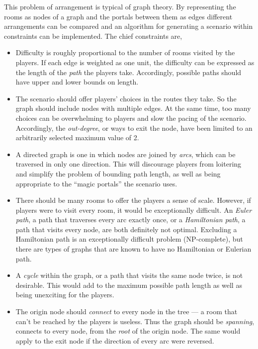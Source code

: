 \documentclass[landscape, a0, final]{a0poster}
\begin{document}
\begin{minipage}{0.25\linewidth}
\begin{minipage}{0.8\linewidth}
This problem of arrangement is typical of graph theory.  By representing the rooms as nodes of a graph and the portals between them as edges different arrangements can be compared and an algorithm for generating a scenario within constraints can be implemented.  The chief constraints are, 
    \begin{itemize} 
        \item Difficulty is roughly proportional to the number of rooms visited by the players.  If each edge is weighted as one unit, the difficulty can be expressed as the length of the \emph{path} the players take.  Accordingly, possible paths should have upper and lower bounds on length.
        \item The scenario should offer players' choices in the routes they take.  So the graph should include nodes with multiple edges.  At the same time, too many choices can be overwhelming to players and slow the pacing of the scenario.  Accordingly, the \emph{out-degree}, or ways to exit the node, have been limited to an arbitrarily selected maximum value of 2.
        \item A directed graph is one in which nodes are joined by \emph{arcs}, which can be traversed in only one direction.  This will discourage players from loitering and simplify the problem of bounding path length, as well as being appropriate to the ``magic portals'' the scenario uses.
        \item There should be many rooms to offer the players a sense of scale.  However, if players were to visit every room, it would be exceptionally difficult.  An \emph{Euler path}, a path that traverses every arc exactly once, or a \emph{Hamiltonian path}, a path that visits every node, are both definitely not optimal.  Excluding a Hamiltonian path is an exceptionally difficult problem (NP-complete), but there are types of graphs that are known to have no Hamiltonian or Eulerian path.
        \item A \emph{cycle} within the graph, or a path that visits the same node twice, is not desirable.  This would add to the maximum possible path length as well as being unexciting for the players.
        \item The origin node should \emph{connect} to every node in the tree --- a room that can't be reached by the players is useless.  Thus the graph should be \emph{spanning}, connects to every node, from the \emph{root} of the origin node.  The same would apply to the exit node if the direction of every arc were reversed.
\end{itemize} 




\end{minipage} %
\end{minipage} %
\end{document}
